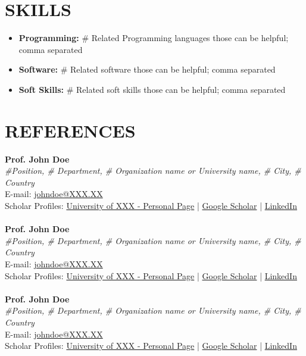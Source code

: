 \documentclass[a4paper,9pt]{extarticle}
\begin{document}
    \section*{SKILLS}
    \begin{itemize}
        \item \textbf{Programming:} \# Related Programming languages those can be helpful; comma separated
        \item \textbf{Software:} \# Related software those can be helpful; comma separated
        \item \textbf{Soft Skills:} \# Related soft skills those can be helpful; comma separated
    \end{itemize}

    \section*{REFERENCES}
    \textbf{Prof. John Doe}\\
    \textit{\#Position, \# Department, \# Organization name or University name, \# City, \# Country}\\
    E-mail: \href{mailto:johndoe@XXX.XX}{johndoe@XXX.XX}\\
    Scholar Profiles: \href{related link}{University of XXX - Personal Page} | \href{related link}{Google Scholar} | \href{https://www.linkedin.com/in/xxxxxxxx}{LinkedIn}\\ \\
    \textbf{Prof. John Doe}\\
    \textit{\#Position, \# Department, \# Organization name or University name, \# City, \# Country}\\
    E-mail: \href{mailto:johndoe@XXX.XX}{johndoe@XXX.XX}\\
    Scholar Profiles: \href{related link}{University of XXX - Personal Page} | \href{related link}{Google Scholar} | \href{https://www.linkedin.com/in/xxxxxxxx}{LinkedIn}\\ \\
    \textbf{Prof. John Doe}\\
    \textit{\#Position, \# Department, \# Organization name or University name, \# City, \# Country}\\
    E-mail: \href{mailto:johndoe@XXX.XX}{johndoe@XXX.XX}\\
    Scholar Profiles: \href{related link}{University of XXX - Personal Page} | \href{related link}{Google Scholar} | \href{https://www.linkedin.com/in/xxxxxxxx}{LinkedIn}\\ \\
\end{document}
